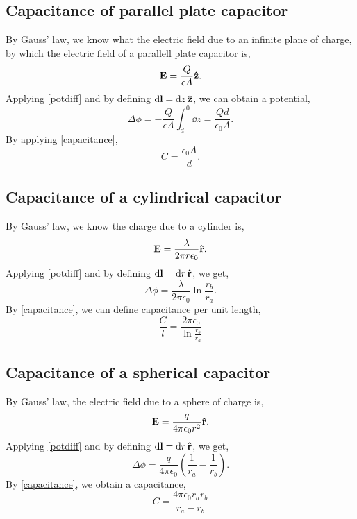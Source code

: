 \documentclass{book}
\begin{document}
\subsection{Capacitance of parallel plate capacitor}
By Gauss' law, we know what the electric field due to an infinite plane of charge, by which the electric field of a parallell plate capacitor is,
\begin{equation}
    \vb{E} = \frac{Q}{\epsilon A}\vu{z}.
\end{equation}
Applying \eqref{potdiff} and by defining $\dd{\vb{l}} = \dd{z}\vu{z}$, we can obtain a potential,
\begin{equation}
    \Delta \phi = -\frac{Q}{\epsilon A}\int_d^0\dd{z} = \frac{Qd}{\epsilon_0 A}.
\end{equation}
By applying \eqref{capacitance},
\begin{equation}
    C = \frac{\epsilon_0A}{d}.
\end{equation}
\subsection{Capacitance of a cylindrical capacitor}
By Gauss' law, we know the charge due to a cylinder is,
\begin{equation}
    \vb{E} = \frac{\lambda}{2\pi r \epsilon_0}\vu{r}.
\end{equation}
Applying \eqref{potdiff} and by defining $\dd{\vb{l}} = \dd{r}\vu{r}$, we get,
\begin{equation}
    \Delta \phi = \frac{\lambda}{2\pi\epsilon_0}\ln{\frac{r_b}{r_a}}.
\end{equation}
By \eqref{capacitance}, we can define capacitance per unit length,
\begin{equation}
    \frac{C}{l} = \frac{2\pi\epsilon_0}{\ln{\frac{r_b}{r_a}}}
\end{equation}
\subsection{Capacitance of a spherical capacitor}
By Gauss' law, the electric field due to a sphere of charge is,
\begin{equation}
    \vb{E} = \frac{q}{4\pi\epsilon_0r^2}\vu{r}.
\end{equation}
Applying \eqref{potdiff} and by defining $\dd{\vb{l}} = \dd{r}\vu{r}$, we get,
\begin{equation}
    \Delta \phi = \frac{q}{4\pi\epsilon_0}\left(\frac{1}{r_a} - \frac{1}{r_b}\right).
\end{equation}
By \eqref{capacitance}, we obtain a capacitance,
\begin{equation}
    C = \frac{4\pi\epsilon_0r_ar_b}{r_a - r_b}
\end{equation}
\end{document}
